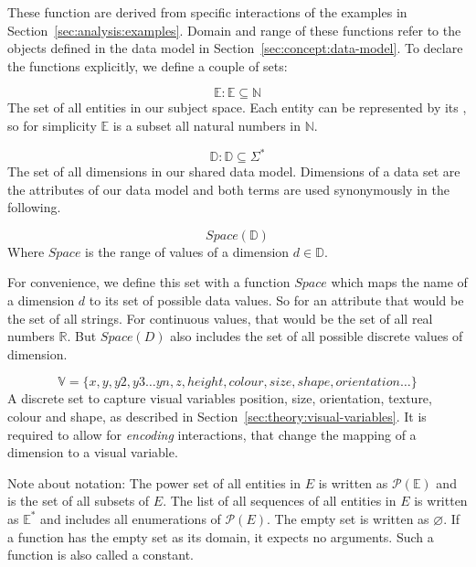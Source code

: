 These function are derived from specific interactions of the examples in Section~\ref{sec:analysis:examples}.
Domain and range of these functions refer to the objects defined in the data model in Section~\ref{sec:concept:data-model}.
To declare the functions explicitly, we define a couple of sets:

\begin{equation} \mathbb{E} : \mathbb{E} \subseteq \mathbb{N}  \end{equation}
  The set of all entities in our subject space.
  Each entity can be represented by its , so for simplicity $\mathbb{E}$ is a subset all natural numbers in $\mathbb{N}$.

\begin{equation} \mathbb{D} : \mathbb{D} \subseteq \Sigma^* \end{equation}
  The set of all dimensions in our shared data model.
  Dimensions of a data set are the attributes of our data model and both terms are used synonymously in the following.

\begin{equation} Space(\mathbb{D}) \end{equation}
  Where $Space$ is the range of values of a dimension $d \in \mathbb{D}$.

  For convenience, we define this set with a function $Space$ which maps the name of a dimension $d$ to its set of possible data values.
  So for an attribute  that would be the set of all strings.
  For continuous values, that would be the set of all real numbers $\mathbb{R}$.
  But $Space(D)$ also includes the set of all possible discrete values of dimension. 

\begin{equation} \mathbb{V} = \{x,y,y2,y3\ldots{}yn,z,height,colour,size,shape,orientation\ldots{}\} \end{equation}
  A discrete set to capture visual variables position, size, orientation, texture, colour and shape, as described in Section~\ref{sec:theory:visual-variables}.
  It is required to allow for \emph{encoding} interactions, that change the mapping of a dimension to a visual variable.

Note about notation:
The power set of all entities in $E$ is written as $ \mathcal{P}(\mathbb{E})$ and is the set of all subsets of $E$.
The list of all sequences of all entities in $E$ is written as $ \mathbb{E^*} $ and includes all enumerations of $\mathcal{P}(E)$.
The empty set is written as $\varnothing$.
If a function has the empty set as its domain, it expects no arguments.
Such a function is also called a constant.

